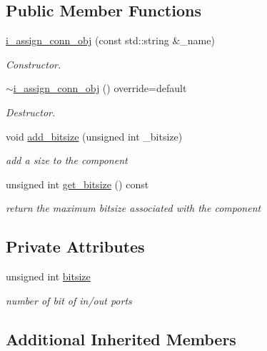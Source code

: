 \subsection*{Public Member Functions}
\begin{DoxyCompactItemize}
\item 
\hyperlink{classi__assign__conn__obj_aa987d9ecde9d90d5376226743c7a8b93}{i\+\_\+assign\+\_\+conn\+\_\+obj} (const std\+::string \&\+\_\+name)
\begin{DoxyCompactList}\small\item\em Constructor. \end{DoxyCompactList}\item 
\hyperlink{classi__assign__conn__obj_ae7272c8e50f65ccd5a389f3258f89542}{$\sim$i\+\_\+assign\+\_\+conn\+\_\+obj} () override=default
\begin{DoxyCompactList}\small\item\em Destructor. \end{DoxyCompactList}\item 
void \hyperlink{classi__assign__conn__obj_a60ae115cd0503e92eae2a42b0b2ae456}{add\+\_\+bitsize} (unsigned int \+\_\+bitsize)
\begin{DoxyCompactList}\small\item\em add a size to the component \end{DoxyCompactList}\item 
unsigned int \hyperlink{classi__assign__conn__obj_a5fafefd0507bf959d2c0fc1810616674}{get\+\_\+bitsize} () const
\begin{DoxyCompactList}\small\item\em return the maximum bitsize associated with the component \end{DoxyCompactList}\end{DoxyCompactItemize}
\subsection*{Private Attributes}
\begin{DoxyCompactItemize}
\item 
unsigned int \hyperlink{classi__assign__conn__obj_a7b6edcc112fc8f747611f012ae2b2605}{bitsize}
\begin{DoxyCompactList}\small\item\em number of bit of in/out ports \end{DoxyCompactList}\end{DoxyCompactItemize}
\subsection*{Additional Inherited Members}


